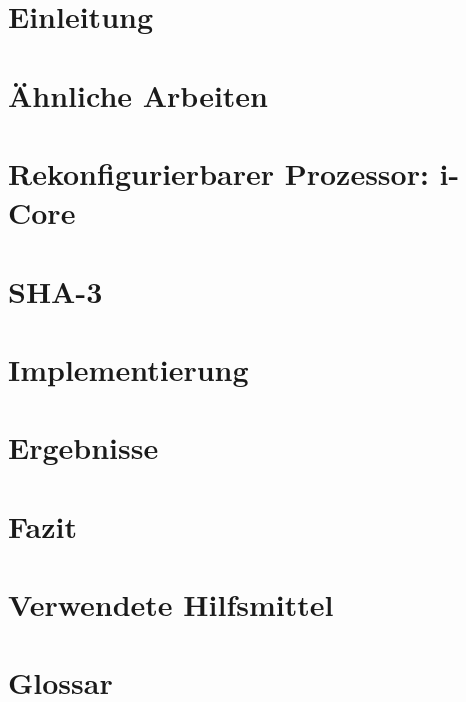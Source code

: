 \chapter{Einleitung}


\chapter{Ähnliche Arbeiten}


\chapter{Rekonfigurierbarer Prozessor: i-Core}


\chapter{SHA-3}


\chapter{Implementierung}


\newpage

\newpage


\chapter{Ergebnisse}
\label{cha:ergebnisse}


\chapter{Fazit}


\chapter{Verwendete Hilfsmittel}


\chapter{Glossar}


%
